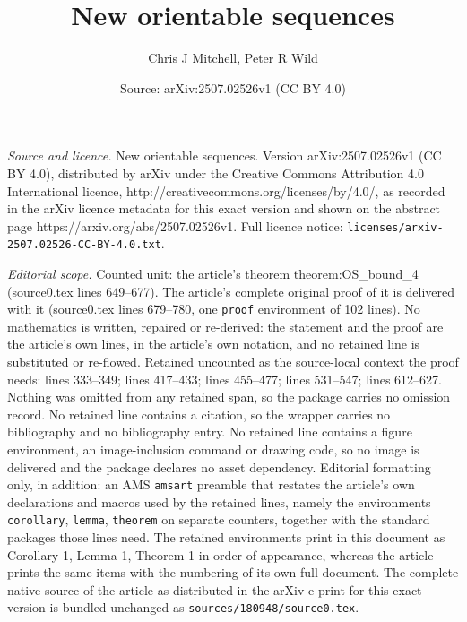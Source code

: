 \documentclass[10pt,a4paper]{amsart}
\title{New orientable sequences}
\author{Chris J Mitchell, Peter R Wild}
\date{Source: arXiv:2507.02526v1 (CC BY 4.0)}
\begin{document}
\maketitle

\noindent\emph{Source and licence.} New orientable sequences. Version arXiv:2507.02526v1 (CC BY 4.0), distributed by arXiv under the Creative Commons Attribution 4.0 International licence, http://creativecommons.org/licenses/by/4.0/, as recorded in the arXiv licence metadata for this exact version and shown on the abstract page https://arxiv.org/abs/2507.02526v1. Full licence notice: \texttt{licenses/arxiv-2507.02526-CC-BY-4.0.txt}.\par\smallskip

\noindent\textit{Editorial scope.} Counted unit: the article's theorem theorem:OS\_bound\_4 (source0.tex lines 649--677). The article's complete original proof of it is delivered with it (source0.tex lines 679--780, one \texttt{proof} environment of 102 lines). No mathematics is written, repaired or re-derived: the statement and the proof are the article's own lines, in the article's own notation, and no retained line is substituted or re-flowed.  Retained uncounted as the source-local context the proof needs: lines 333--349; lines 417--433; lines 455--477; lines 531--547; lines 612--627.  Nothing was omitted from any retained span, so the package carries no omission record.  No retained line contains a citation, so the wrapper carries no bibliography and no bibliography entry.  No retained line contains a figure environment, an image-inclusion command or drawing code, so no image is delivered and the package declares no asset dependency.  Editorial formatting only, in addition: an AMS \texttt{amsart} preamble that restates the article's own declarations and macros used by the retained lines, namely the environments \texttt{corollary}, \texttt{lemma}, \texttt{theorem} on separate counters, together with the standard packages those lines need.  The retained environments print in this document as Corollary 1, Lemma 1, Theorem 1 in order of appearance, whereas the article prints the same items with the numbering of its own full document.  The complete native source of the article as distributed in the arXiv e-print for this exact version is bundled unchanged as \texttt{sources/180948/source0.tex}.
\end{document}
